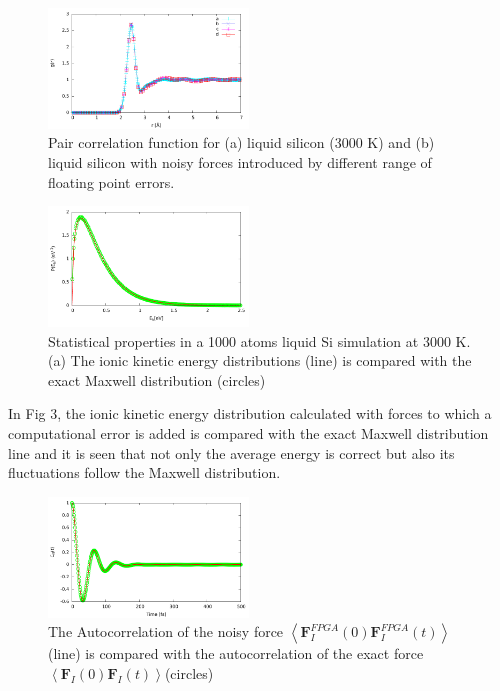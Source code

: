 \documentclass[aps,pre,twocolumn,showpacs,preprintnumbers,amsmath,amssymb]{revtex4-1}
\begin{document}
\begin{figure}[h!]%
\begin{center}
\includegraphics[width=0.475\textwidth]
{figures/rdffloatingpt.pdf}
\end{center}
\caption{\label{Fig2}
Pair correlation function for (a) liquid silicon (3000 K) and (b) liquid silicon with noisy forces introduced by different range of floating point errors.
} \end{figure}

\begin{figure}[h!]%
\begin{center}
\includegraphics[width=0.475\textwidth]
{figures/maxwelldistribution.pdf}
\end{center}
\caption{\label{Fig3}
Statistical properties in a 1000 atoms liquid Si simulation at 3000 K. (a) The ionic kinetic energy distributions (line) is compared with the exact Maxwell distribution (circles)
} \end{figure}

In Fig 3, the ionic kinetic energy distribution calculated with forces to which a computational error is added is compared with the exact Maxwell distribution line and it is seen that not only the average energy is correct but also its fluctuations follow the Maxwell distribution. 

\begin{figure}[h!]%
\begin{center}
\includegraphics[width=0.475\textwidth]
{figures/force_autocorrelation.pdf}
\end{center}
\caption{\label{Fig4}
The Autocorrelation of the noisy force \(
 \left \langle \textbf{F}_{I}^{FPGA}\left ( 0 \right ) \textbf{F}_{I}^{FPGA}\left ( t \right )\right \rangle \)(line) is compared with the autocorrelation of the exact force \( \left \langle \textbf{F}_{I}\left ( 0 \right ) \textbf{F}_{I}\left ( t \right )\right \rangle \)(circles) 
} \end{figure}
\end{document}
